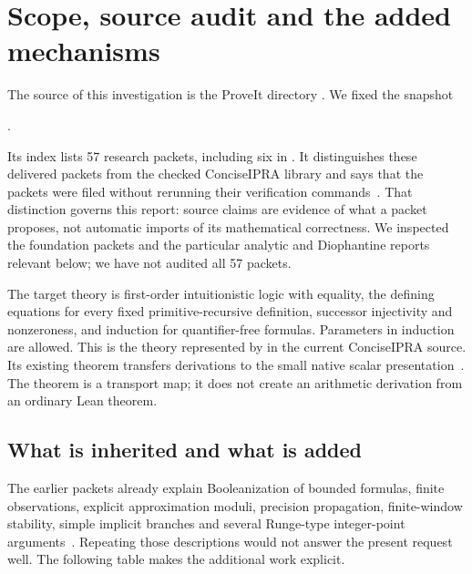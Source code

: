 \section{Scope, source audit and the added mechanisms}\label{sec:scope}

The source of this investigation is the ProveIt directory
. We fixed the snapshot
\begin{center}
.
\end{center}
Its index lists 57 research packets, including six in .
It distinguishes these delivered packets from the checked ConciseIPRA
library and says that the packets were filed without rerunning their
verification commands~\cite{repository}. That distinction governs this
report: source claims are evidence of what a packet proposes, not automatic
imports of its mathematical correctness. We inspected the foundation
packets and the particular analytic and Diophantine reports relevant below;
we have not audited all 57 packets.

The target theory is first-order intuitionistic logic with equality, the
defining equations for every fixed primitive-recursive definition, successor
injectivity and nonzeroness, and induction for quantifier-free formulas.
Parameters in induction are allowed. This is the theory represented by
 in the current ConciseIPRA source. Its existing
 theorem transfers derivations to the small native
scalar presentation~\cite{kernel,bridge}. The theorem is a transport map;
it does not create an arithmetic derivation from an ordinary Lean theorem.

\subsection{What is inherited and what is added}

The earlier packets already explain Booleanization of bounded formulas,
finite observations, explicit approximation moduli, precision propagation,
finite-window stability, simple implicit branches and several Runge-type
integer-point arguments~\cite{oldframework,embeddingpacket,finiteobservation,
evidencepacket,uniformpacket,frameworkdated}. Repeating those descriptions
would not answer the present request well. The following table makes the
additional work explicit.

